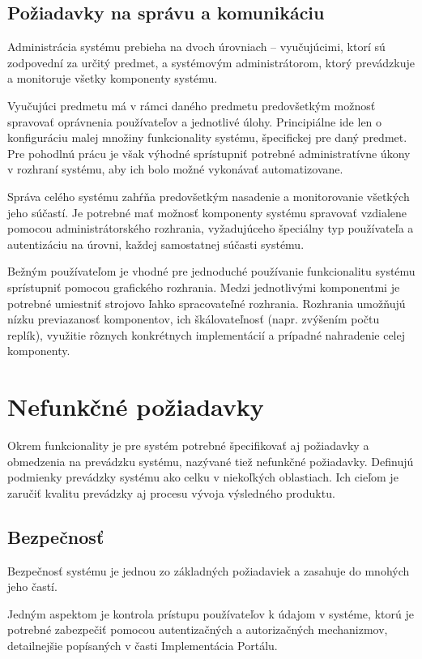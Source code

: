\documentclass[
  digital, %
  twoside, %
  table,   %
  lof,     %
  lot,     %
]{fithesis3}
\begin{document}
\subsection{Požiadavky na správu a komunikáciu}

Administrácia systému prebieha na dvoch úrovniach -- vyučujúcimi, ktorí sú zodpovední za určitý predmet, a systémovým administrátorom, ktorý prevádzkuje a monitoruje všetky komponenty systému. 

Vyučujúci predmetu má v rámci daného predmetu predovšetkým možnosť spravovať oprávnenia používateľov a jednotlivé úlohy. Principiálne ide len o konfiguráciu malej množiny funkcionality systému, špecifickej pre daný predmet. Pre pohodlnú prácu je však výhodné sprístupniť potrebné administratívne úkony v rozhraní systému, aby ich bolo možné vykonávať automatizovane.

Správa celého systému zahŕňa predovšetkým nasadenie a monitorovanie všetkých jeho súčastí. Je potrebné mať možnosť komponenty systému spravovať vzdialene pomocou administrátorského rozhrania, vyžadujúceho špeciálny typ používateľa a autentizáciu na úrovni, každej samostatnej súčasti systému.

Bežným používateľom je vhodné pre jednoduché používanie funkcionalitu systému sprístupniť pomocou grafického rozhrania. Medzi jednotlivými komponentmi je potrebné umiestniť strojovo ľahko spracovateľné rozhrania. Rozhrania umožňujú nízku previazanosť komponentov, ich škálovateľnosť (napr. zvýšením počtu replík), využitie rôznych konkrétnych implementácií a prípadné nahradenie celej komponenty.

\section{Nefunkčné požiadavky}

Okrem funkcionality je pre systém potrebné špecifikovať aj požiadavky a obmedzenia na prevádzku systému, nazývané tiež nefunkčné požiadavky. Definujú podmienky prevádzky systému ako celku v niekoľkých oblastiach. Ich cieľom je zaručiť kvalitu prevádzky aj procesu vývoja výsledného produktu.

\subsection{Bezpečnosť}
Bezpečnosť systému je jednou zo základných požiadaviek a zasahuje do mnohých jeho častí.

Jedným aspektom je kontrola prístupu používateľov k údajom v systéme, ktorú je potrebné zabezpečiť pomocou autentizačných a autorizačných mechanizmov, detailnejšie popísaných v časti Implementácia Portálu. %
\end{document}
